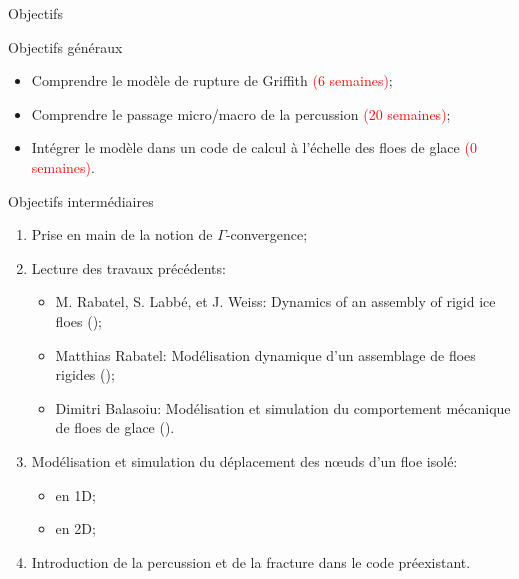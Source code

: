 \begin{frame}{Objectifs}

  \begin{exampleblock}{Objectifs généraux}

    \begin{itemize}
      \item Comprendre le modèle de rupture de Griffith \textcolor{red}{(6 semaines)}; \pause
      \item Comprendre le passage micro/macro de la percussion \textcolor{red}{(20 semaines)}; \pause
      \item Intégrer le modèle dans un code de calcul à l’échelle des floes de glace \textcolor{red}{(0 semaines)}.
    \end{itemize}
  \end{exampleblock}

  \pause

  \begin{block}{Objectifs intermédiaires}

    \begin{enumerate}
      \item Prise en main de la notion de $\Gamma$‑convergence;
      \item Lecture des travaux précédents:
      \begin{itemize}
        \item \alert{M. Rabatel, S. Labbé, et J. Weiss}: Dynamics of an assembly of rigid ice floes (\citeyear{rabatel2015dynamics}); 
        \item \alert{Matthias Rabatel}: Modélisation dynamique d’un assemblage de floes rigides (\citeyear{rabatel2015modelisation});
        \item \alert{Dimitri Balasoiu}: Modélisation et simulation du comportement mécanique de floes de glace (\citeyear{balasoiu2020modelisation}).
      \end{itemize}
      
      \item Modélisation et simulation du déplacement des n\oe{}uds d'un floe isolé:
      \begin{itemize}
        \item en 1D;
        \item en 2D;
      \end{itemize}

      \item Introduction de la percussion et de la fracture dans le code préexistant.

    \end{enumerate}
  \end{block}

\end{frame}


